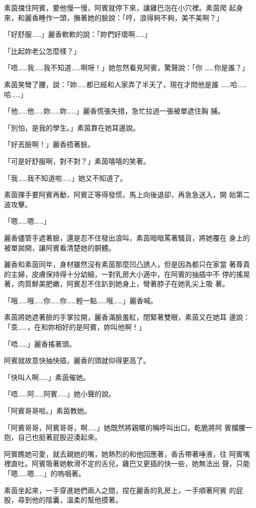 素茵擋住阿賓，要他慢一慢，阿賓就停下來，讓雞巴泡在小穴裡。素茵爬
起身來，和麗香睡作一頭，撫著她的臉說：「哼，浪得夠不夠，美不美啊？」

「好舒服……」麗香軟軟的說：「妳們好壞啊……」

「比起妳老公怎麼樣？」

「唔……我……我不知道……啊呀！」她忽然看見阿賓，驚聲說：「你
……你是誰？」

素茵笑彎了腰，說：「妳……都已經和人家弄了半天了，現在才問他是誰
……哈……哈……」

「他……他……妳……妳……」麗香慌張失措，急忙拉過一張被單遮住胸
脯。

「別怕，是我的學生。」素茵靠在她耳邊說。

「好丟臉啊！」麗香捂著臉。

「可是好舒服啊，對不對？」素茵嘻嘻的笑著。

「我……我不知道啦……」她又不知道了。

素茵揮手要阿賓再動，阿賓正等得發慌，馬上向後退卻，再急急送入，開
始第二波攻擊。

「嗯……嗯……」

麗香儘管手遮著臉，還是忍不住發出浪叫，素茵暗暗罵著騷貨，將她覆在
身上的被單拋開，讓阿賓看清楚她的胴體。

麗香和素茵同年，身材雖然沒有素茵那麼凹凸誘人，但是因為都只在家當
著尊貴的主婦，皮膚保持得十分幼細，一對乳房大小適中，在阿賓的抽插中不
停的搖晃著，肉質鮮美肥嫩，阿賓忍不住趴到她身上，彎著脖子在她乳尖上吸
著。

「哦……哦……你……你……輕一點……哦……」麗香喊。

素茵將她遮著臉的手掌拉開，麗香滿臉羞紅，閉緊著雙眼，素茵又在她耳
邊說：「乖……，在和妳相好的是阿賓，妳叫他啊！」

「唔……」麗香搖著頭。

阿賓就故意快抽快插，麗香的頭就仰得更高了。

「快叫人啊……」素茵催她。

「唔……阿……阿賓……」她小聲的說。

「阿賓哥哥啦。」素茵教她。

「阿賓哥哥，阿賓哥哥，啊……」她既然將親暱的稱呼叫出口，乾脆將阿
賓攔腰一抱，自己也挺著屁股迎湊起來。

阿賓瞧她可愛，就去親她的嘴，她熱烈的和他回應著，香舌帶著唾液，往
阿賓嘴裡直吐。阿賓吸著她軟滑不定的舌兒，雞巴又更插的快一些，她無法出
聲，只能「嗯……嗯……」的嗚咽著。

素茵坐起來，一手穿進她們兩人之間，捏在麗香的乳房上，一手順著阿賓
的屁股，尋到他的陰囊，溫柔的幫他摸著。

